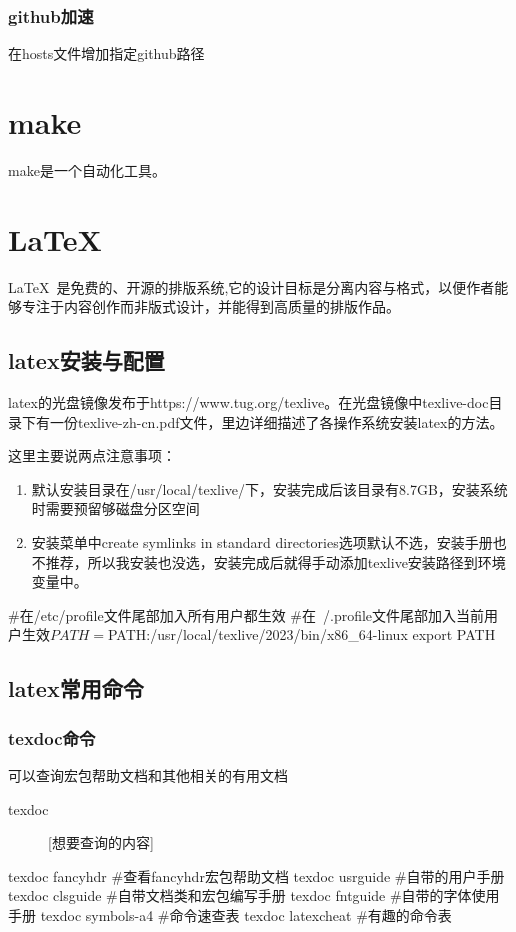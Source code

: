 \subsubsection{github加速}
在hosts文件增加指定github路径


\section{make}
make是一个自动化工具。
\section{\LaTeX}
\LaTeX\ 是免费的、开源的排版系统,它的设计目标是分离内容与格式，以便作者能够专注于内容创作而非版式设计，并能得到高质量的排版作品。
	\subsection{latex安装与配置}
	latex的光盘镜像发布于https://www.tug.org/texlive。在光盘镜像中texlive-doc目录下有一份texlive-zh-cn.pdf文件，里边详细描述了各操作系统安装latex的方法。

	这里主要说两点注意事项：
	\begin{enumerate}
		\item 默认安装目录在/usr/local/texlive/下，安装完成后该目录有8.7GB，安装系统时需要预留够磁盘分区空间
		\item 安装菜单中create symlinks in standard directories选项默认不选，安装手册也不推荐，所以我安装也没选，安装完成后就得手动添加texlive安装路径到环境变量中。
	\end{enumerate}
\begin{shell}
#在/etc/profile文件尾部加入所有用户都生效
#在~/.profile文件尾部加入当前用户生效$
PATH=$PATH:/usr/local/texlive/2023/bin/x86_64-linux
export PATH
\end{shell}
\subsection{latex常用命令}
\subsubsection{texdoc命令}
	可以查询宏包帮助文档和其他相关的有用文档
	\begin{description}
		\item[texdoc] [想要查询的内容]
	\end{description}
\begin{shell}
texdoc fancyhdr #查看fancyhdr宏包帮助文档
texdoc usrguide #自带的用户手册
texdoc clsguide #自带文档类和宏包编写手册
texdoc fntguide #自带的字体使用手册
texdoc symbols-a4 #命令速查表
texdoc latexcheat #有趣的命令表
\end{shell}
